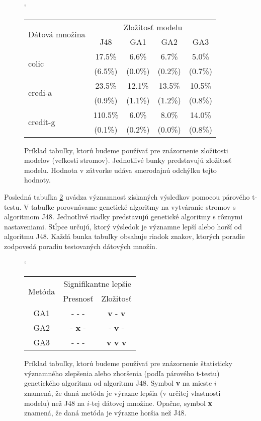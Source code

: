 \begin{figure}[h]
\catcode`
\centering 
\newcommand\T{\rule{0pt}{2.6ex}}       %
\newcommand\B{\rule[-1.2ex]{0pt}{0pt}} %
\begin{tabular}{|l||c|c|c|c||}
\hline \multirow{2}{*}{Dátová množina} & \multicolumn{4}{|c||}{Zložitosť modelu} \\ 
\cline{2-5} & J48 & GA1 & GA2 & GA3 \\
\hline
\hline \multirow{2}{*}{colic} & 17.5\% & 6.6\% & 6.7\% & 5.0\% \T\\[-1.5ex]
& \tiny (6.5\%) & \tiny (0.0\%) & \tiny (0.2\%) & \tiny (0.7\%)\B\\
\hline \multirow{2}{*}{credi-a} & 23.5\% & 12.1\% & 13.5\% & 10.5\% \T\\[-1.5ex]
& \tiny (0.9\%) & \tiny (1.1\%) & \tiny (1.2\%) & \tiny (0.8\%)\B\\
\hline \multirow{2}{*}{credit-g} & 110.5\% & 6.0\% & 8.0\% & 14.0\% \T\\[-1.5ex]
& \tiny (0.1\%) & \tiny (0.2\%) & \tiny (0.0\%) & \tiny (0.8\%)\B\\
\hline
\end{tabular}
\caption{Príklad tabuľky, ktorú budeme používať pre znázornenie zložitosti modelov (veľkosti stromov). Jednotlivé bunky predstavujú zložitosť modelu. Hodnota v zátvorke udáva smerodajnú odchýlku tejto hodnoty.}\label{fig:tab2}
\end{figure}

Posledná tabuľka \ref{fig:tab3} uvádza významnosť získaných výsledkov pomocou párového t-testu. V tabuľke porovnávame genetické algoritmy na vytváranie stromov s algoritmom J48. Jednotlivé riadky predstavujú genetické algoritmy s rôznymi nastaveniami. Stĺpce určujú, ktorý výsledok je významne lepší alebo horší od algoritmu J48. Každá bunka tabuľky obsahuje riadok znakov, ktorých poradie zodpovedá poradiu testovaných dátových množín.

\begin{figure}[h]
\catcode`
\centering 
\newcommand\T{\rule{0pt}{2.6ex}}       %
\newcommand\B{\rule[-1.2ex]{0pt}{0pt}} %
\begin{tabular}{|c||c|c||}
\hline
\hline \multirow{2}{*}{Metóda} & \multicolumn{2}{|c||}{Signifikantne lepšie} 
\\
\cline{2-3} & Presnosť & Zložitosť \\
\hline
\hline
GA1 & - - - & \textbf{v} - \textbf{v} \\ \hline
GA2 & - \textbf{x} - & - \textbf{v} - \\ \hline
GA3 & - - - & \textbf{v} \textbf{v} \textbf{v} \\ \hline
\end{tabular}
\caption{Príklad tabuľky, ktorú budeme používať pre znázornenie štatisticky významného zlepšenia alebo zhoršenia (podľa párového t-testu) genetického algoritmu od algoritmu J48. Symbol \textbf{v} na mieste $i$ znamená, že daná metóda je výrazne lepšia (v určitej vlastnosti modelu) než J48 na $i$-tej dátovej množine. Opačne, symbol \textbf{x} znamená, že daná metóda je výrazne horšia než J48.}\label{fig:tab3}
\end{figure}

